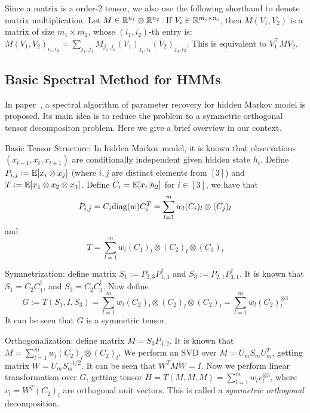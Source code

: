 Since a matrix is a order-2 tensor, we also use the following shorthand to denote matrix multiplication. Let $M \in \mathbb{R}^{n_1} \otimes \mathbb{R}^{n_2}$. If $V_i \in \mathbb{R}^{m_i \times n_i}$, then $M(V_1, V_2)$ is a matrix of size $m_1 \times m_2$, whose $(i_1, i_2)$-th entry is: $M(V_1, V_2)_{i_1, i_2} = \sum_{j_1, j_2} M_{j_1, j_2} (V_1)_{j_1,i_1} (V_2)_{j_2, i_2}$. This is equivalent to $V_1^{\top} M V_2$.


\subsection{Basic Spectral Method for HMMs}
In paper~\cite{AGHKT12}, a spectral algorithm of parameter recovery for hidden Markov model is proposed.
Its main idea is to reduce the problem to a symmetric orthogonal tensor decompositon problem. Here we give a brief overview in our context.

Basic Tensor Structure: In hidden Markov model, it is known that observations $(x_{t-1}, x_t, x_{t+1})$ are conditionally independent given hidden state $h_t$. Define
$P_{i,j} := \mathbb{E}[x_i \otimes x_j]$ (where $i,j$ are distinct elements from $[3]$) and $T := \mathbb{E}[x_1 \otimes x_2 \otimes x_3]$. Define $C_i = \mathbb{E}[x_i | h_2]$ for $i \in [3]$,
we have that
\[ P_{i,j} = C_i \text{diag}(w) C_i^T = \sum_{l=1}^m w_l (C_i)_l \otimes (C_j)_l \]
and
\[ T = \sum_{l=1}^m w_l (C_1)_l \otimes (C_2)_l \otimes (C_3)_l \]

Symmetrization: define matrix $S_1 := P_{2,3} P_{1,3}^{\dagger}$ and $S_3 := P_{2,1} P_{3,1}^{\dagger}$. It is known that $S_1 = C_2 C_1^{\dagger}$, and
$S_3 = C_2 C_3^{\dagger}$. Now define
\[ G := T(S_1, I, S_3) = \sum_{l=1}^m w_l (C_2)_l \otimes (C_2)_l \otimes (C_2)_l = \sum_{l=1}^m w_l (C_2)_l^{\otimes 3} \]
It can be seen that $G$ is a symmetric tensor.

Orthogonalization: define matrix $M = S_3 P_{3,2}$. It is known that $M = \sum_{l=1}^m w_l (C_2)_l \otimes (C_2)_l$.
We perform an SVD over $M = U_m S_m U_m^T$, getting matrix $W = U_m S_m^{-1/2}$. It can be seen that $W^T M W = I$.
Now we perform linear transformation over $G$, getting tensor $H = T(M, M, M) = \sum_{l=1}^m w_l v_l^{\otimes 3}$, where
$v_l = W^T (C_2)_l$ are orthogonal unit vectors.
This is called a {\em symmetric orthogonal} decomposition.

